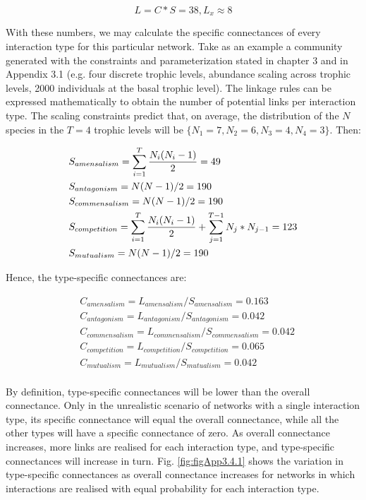\[L = C*S = 38, L_x \approx 8\]

With these numbers, we may calculate the specific connectances of every interaction type for this particular network. Take as an example a community generated with the constraints and parameterization stated in chapter 3 and in Appendix 3.1 (e.g. four discrete trophic levels, abundance scaling across trophic levels, 2000 individuals at the basal trophic level). The linkage rules can be expressed mathematically to obtain the number of potential links per interaction type. The scaling constraints predict that, on average, the distribution of the \(N\) species in the \(T = 4\) trophic levels will be \(\{N_1 = 7, N_2 = 6, N_3 = 4,N_4 = 3\}\). Then:

\begin{align*}
& S_{amensalism} = \sum_{i = 1}^T {N_{i}(N_i-1) \over 2} = 49 \\
& S_{antagonism} = N(N-1)/2 = 190 \\
& S_{commensalism} = N(N-1)/2 = 190 \\
& S_{competition} = \sum_{i = 1}^T {N_{i}(N_i-1) \over 2} + \sum_{j = 1}^{T-1} N_j*N_{j-1}= 123 \\
& S_{mutualism} = N(N-1)/2 = 190
\end{align*}


Hence, the type-specific connectances are:

\begin{align*}
& C_{amensalism} = L_{amensalism}/S_{amensalism} = 0.163 \\
& C_{antagonism} = L_{antagonism}/S_{antagonism} = 0.042 \\
& C_{commensalism} = L_{commensalism}/S_{commensalism} = 0.042 \\
& C_{competition} = L_{competition}/S_{competition} = 0.065 \\
& C_{mutualism} = L_{mutualism}/S_{mutualism} = 0.042 \\
\end{align*}

By definition, type-specific connectances will be lower than the overall connectance. Only in the unrealistic scenario of networks with a single interaction type, its specific connectance will equal the overall connectance, while all the other types will have a specific connectance of zero. As overall connectance increases, more links are realised for each interaction type, and type-specific connectances will increase in turn. Fig. \ref{fig:figApp3.4.1} shows the variation in type-specific connectances as overall connectance increases for networks in which interactions are realised with equal probability for each interaction type.


